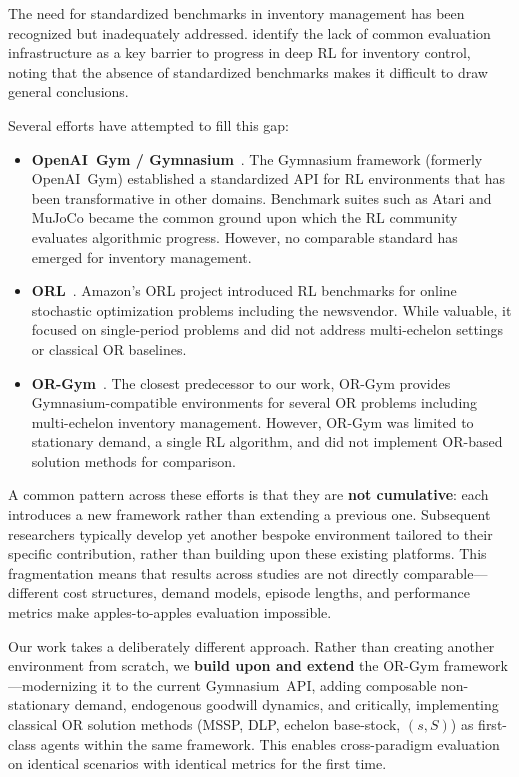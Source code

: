 The need for standardized benchmarks in inventory management has been
recognized but inadequately addressed. \citet{boute2022deep_rl_survey}
identify the lack of common evaluation infrastructure as a key barrier
to progress in deep RL for inventory control, noting that the absence
of standardized benchmarks makes it difficult to draw general conclusions.

Several efforts have attempted to fill this gap:

\begin{itemize}
  \item \textbf{OpenAI~Gym / Gymnasium}~\citep{brockman2016openai}.
        The Gymnasium framework (formerly OpenAI~Gym) established a
        standardized API for RL environments that has been transformative
        in other domains. Benchmark suites such as Atari and MuJoCo
        became the common ground upon which the RL community evaluates
        algorithmic progress. However, no comparable standard has emerged
        for inventory management.

  \item \textbf{ORL}~\citep{balaji2019orl}. Amazon's ORL project
        introduced RL benchmarks for online stochastic optimization
        problems including the newsvendor. While valuable, it focused
        on single-period problems and did not address multi-echelon
        settings or classical OR baselines.

  \item \textbf{OR-Gym}~\citep{hubbs2020orgym}. The closest predecessor
        to our work, OR-Gym provides Gymnasium-compatible environments
        for several OR problems including multi-echelon inventory
        management. However, OR-Gym was limited to stationary demand,
        a single RL algorithm, and did not implement OR-based
        solution methods for comparison.
\end{itemize}

A common pattern across these efforts is that they are \textbf{not
cumulative}: each introduces a new framework rather than extending a
previous one. Subsequent researchers typically develop yet another bespoke
environment tailored to their specific contribution, rather than building
upon these existing platforms. This fragmentation means that results
across studies are not directly comparable---different cost structures,
demand models, episode lengths, and performance metrics make apples-to-apples
evaluation impossible.

Our work takes a deliberately different approach. Rather than creating
another environment from scratch, we \textbf{build upon and extend} the
OR-Gym framework---modernizing it to the current Gymnasium~API, adding
composable non-stationary demand, endogenous goodwill dynamics, and
critically, implementing classical OR solution methods (MSSP, DLP,
echelon base-stock, $(s, S)$) as first-class agents within the same
framework. This enables cross-paradigm evaluation on identical scenarios
with identical metrics for the first time.

